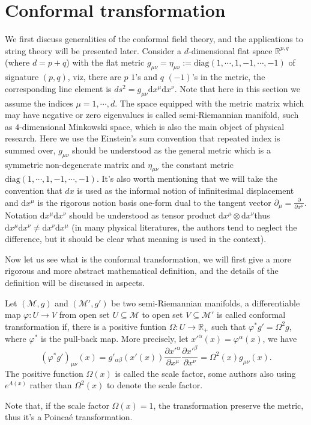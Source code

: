 \documentclass[graybox,envcountchap,sectrefs]{svmono}
\begin{document}
\section{Conformal transformation}
We first discuss generalities of the conformal field theory, and the applications to string theory will be presented later.
Consider a $d$-dimensional flat space $\mathbb{R}^{p,q}$ (where $d=p+q$) with the flat metric $g_{\mu\nu}=\eta_{\mu\nu}:=\mathrm{diag}(1,\cdots,1,-1, \cdots, -1)$ of signature $(p,q)$, viz, there are $p$ $1$'s and  $q$ $(-1)$'s in the metric, the corresponding line element is $ds^2=g_{\mu\nu}\mathrm{d}x^{\mu}\mathrm{d}x^{\nu}$. 
Note that here in this section we assume the indices $\mu=1,\cdots, d$.
The space equipped with the metric matrix which may have negative or zero eigenvalues is called semi-Riemannian manifold, such as $4$-dimensional Minkowski space, which is also the main object of physical research. Here we use the Einstein's sum convention that repeated index is summed over,  $g_{\mu\nu}$ should be understood as the general metric which is  a symmetric non-degenerate matrix and $\eta_{\mu\nu}$ the constant metric $\mathrm{diag}(1,\cdots,1,-1, \cdots, -1)$. It's also worth mentioning that  we will take the convention that $dx$ is used as the informal notion of infinitesimal displacement and $\mathrm{d}x^{\mu}$ is the rigorous notion basis one-form dual to the tangent vector $\partial_{\mu}=\frac{\partial}{\partial x^{\mu}}$. Notation $\mathrm{d}x^{\mu}\mathrm{d}x^{\nu}$ should be understood as tensor product $\mathrm{d}x^{\mu}\otimes\mathrm{d}x^{\nu}$thus $\mathrm{d}x^{\mu}\mathrm{d}x^{\nu}\neq \mathrm{d}x^{\nu}\mathrm{d}x^{\mu}$ (in many physical literatures, the authors tend to neglect the difference, but it should be clear what meaning is used in the context).

Now let us see what is the conformal transformation, we will first give a more  rigorous  and more abstract mathematical definition, and the details of the definition will be discussed in aspects.
\begin{svgraybox}
\begin{definition}
Let $(\mathcal{M},g)$ and $(\mathcal{M}',g')$ be two semi-Riemannian manifolds, a differentiable map $\varphi:U\to V$ from open set $U\subseteq \mathcal{M}$ to open set $V\subseteq \mathcal{M}'$ is called conformal transformation if, there is a positive funtion $\Omega:U\to \mathbb{R}_{+}$  such that $\varphi^* g'=\Omega^2 g$, where $\varphi^*$ is the pull-back map. More precisely, let $x'^{\alpha}(x)=\varphi^{\alpha}(x)$, we have
\begin{equation}
(\varphi^*g')_{\mu\nu}(x)=g'_{\alpha\beta}(x'(x))\frac{\partial x'^{\alpha}}{\partial x^{\mu}}\frac{\partial x'^{\beta}}{\partial x^{\nu}}=\Omega^2(x)g_{\mu\nu}(x).
\end{equation}
The positive function $\Omega(x)$ is called the scale factor, some authors also using $e^{\Lambda(x)}$ rather than $\Omega^2(x)$ to denote the scale factor.
\end{definition}
\end{svgraybox}
Note that, if the scale factor $\Omega(x)=1$, the transformation preserve the metric, thus it's a Poinca\'{e} transformation.
\end{document}
